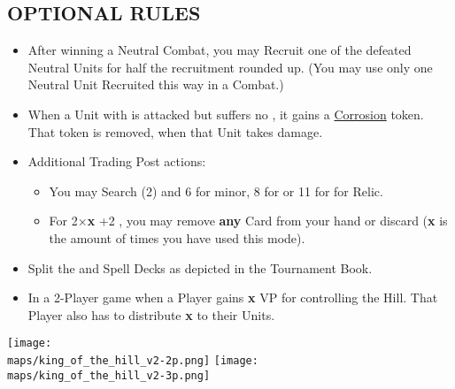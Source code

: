 \begin{multicols*}{2}
\subsection*{\MakeUppercase{Optional Rules}}
\begin{itemize}
  \item After winning a Neutral Combat, you may Recruit one of the defeated Neutral Units for half the recruitment  rounded up. (You may use only one Neutral Unit Recruited this way in a Combat.)
  \item When a Unit with  is attacked but suffers no , it gains a \href{https://archon-studio.com/files/manuals/homm/HoMM-Stronghold-Mission-Book-Beta_EN.pdf}{Corrosion} token. That token is removed, when that Unit takes damage.
  \item Additional Trading Post actions:
  \begin{itemize}
    \item You may Search (2)  and  6  for minor, 8 for  or 11 for  for Relic.
    \item For 2×\textbf{x} +2  , you may remove \textbf{any} Card from your hand or discard (\textbf{x} is the amount of times you have used this mode).
  \end{itemize}
  \item Split the  and Spell Decks as depicted in the Tournament Book.
  \item In a 2-Player game when a Player gains \textbf{x} VP for controlling the Hill. That Player also has to distribute \textbf{x}  to their Units.
\end{itemize}

\begin{center}
  \vfill
  \texttt{[image: \\maps/king\_of\_the\_hill\_v2-2p.png]}
  \vfill
  \texttt{[image: \\maps/king\_of\_the\_hill\_v2-3p.png]}
\end{center}

\end{multicols*}
